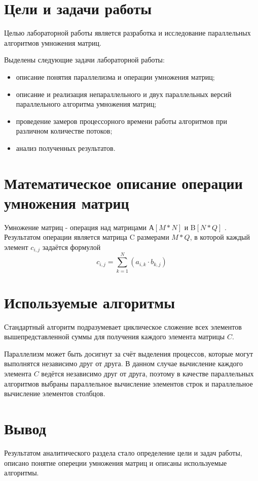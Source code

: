 \section{Цели и задачи работы}
Целью лабораторной работы является разработка и исследование параллельных алгоритмов умножения матриц.

Выделены следующие задачи лабораторной работы:

\begin{itemize}
\item описание понятия параллелизма и операции умножения матриц;
\item описание и реализация непараллельного и двух параллельных версий параллельного алгоритма умножения матриц;
\item проведение замеров процессорного времени работы алгоритмов при различном количестве потоков;
\item анализ полученных результатов.
\end{itemize}

\section{Математическое описание операции умножения матриц}
Умножение матриц - операция над матрицами А$[M*N] $ и B$[N*Q]$ \cite{mul_def}. Результатом операции является матрица C размерами $ M*Q $, в которой каждый элемент $c_{i,j}$ задаётся формулой
\begin{equation} 
	c_{i,j} = \sum_{k=1}^{N}(a_{i,k} \cdot b_{k,j})
\end{equation}


\section{Используемые алгоритмы}
Стандартный алгоритм подразумевает циклическое сложение всех элементов вышепредставленной суммы для получения каждого элемента матрицы $C$.

Параллелизм может быть досигнут за счёт выделения процессов, которые могут выполнятся независимо друг от друга. В данном случае вычисление каждого элемента $C$ ведётся независимо друг от друга, поэтому в качестве параллельных алгоритмов выбраны параллельное вычисление элементов строк и параллельное вычисление элементов столбцов.

\section*{Вывод}
Результатом аналитического раздела стало определение цели и задач работы, описано понятие опереции умножения матриц и описаны используемые алгоритмы.